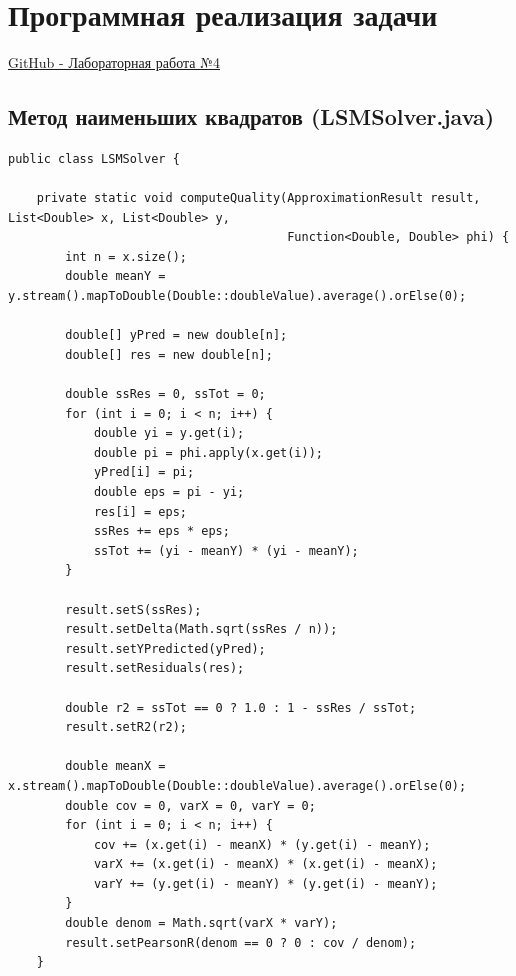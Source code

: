 \section{Программная реализация задачи}

\href{https://github.com/utpwtb/ITMO/tree/main/4%20%D0%92%D1%8B%D1%87%D0%B8%D1%81%D0%BB%D0%B8%D1%82%D0%B5%D0%BB%D1%8C%D0%BD%D0%B0%D1%8F%20%D0%9C%D0%B0%D1%82%D0%B5%D0%BC%D0%B0%D1%82%D0%B8%D0%BA%D0%B0/%D0%9F%D1%80%D0%BE%D0%B3%D1%80%D0%B0%D0%BC%D0%BC%D0%B0/Lab4/CM_Lab4}{{\color{blue} GitHub - Лабораторная работа №4}}

\subsection{Метод наименьших квадратов (LSMSolver.java)}

\begin{lstlisting}[style=javaStyle, label=code:lsm]
public class LSMSolver {

    private static void computeQuality(ApproximationResult result, List<Double> x, List<Double> y,
                                       Function<Double, Double> phi) {
        int n = x.size();
        double meanY = y.stream().mapToDouble(Double::doubleValue).average().orElse(0);

        double[] yPred = new double[n];
        double[] res = new double[n];

        double ssRes = 0, ssTot = 0;
        for (int i = 0; i < n; i++) {
            double yi = y.get(i);
            double pi = phi.apply(x.get(i));
            yPred[i] = pi;
            double eps = pi - yi;
            res[i] = eps;
            ssRes += eps * eps;
            ssTot += (yi - meanY) * (yi - meanY);
        }

        result.setS(ssRes);
        result.setDelta(Math.sqrt(ssRes / n));
        result.setYPredicted(yPred);
        result.setResiduals(res);

        double r2 = ssTot == 0 ? 1.0 : 1 - ssRes / ssTot;
        result.setR2(r2);

        double meanX = x.stream().mapToDouble(Double::doubleValue).average().orElse(0);
        double cov = 0, varX = 0, varY = 0;
        for (int i = 0; i < n; i++) {
            cov += (x.get(i) - meanX) * (y.get(i) - meanY);
            varX += (x.get(i) - meanX) * (x.get(i) - meanX);
            varY += (y.get(i) - meanY) * (y.get(i) - meanY);
        }
        double denom = Math.sqrt(varX * varY);
        result.setPearsonR(denom == 0 ? 0 : cov / denom);
    }


\end{lstlisting}

